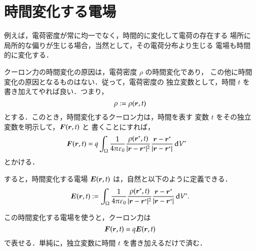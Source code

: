            \section{時間変化する電場}
                例えば，電荷密度が常に均一でなく，時間的に変化して電荷の存在する
                場所に局所的な偏りが生じる場合，当然として，その電荷分布より生じる
                電場も時間的に変化する．

                クーロン力の時間変化の原因は，電荷密度 $\rho$ の時間変化であり，
                この他に時間変化の原因となるものはない．従って，電荷密度の
                独立変数として，時間 $t$ を書き加えてやれば良い．つまり，
                    \begin{equation*}
                        \rho := \rho(\boldsymbol{r}, t)
                    \end{equation*}
                とする．このとき，時間変化するクーロン力は，時間を表す
                変数 $t$ をその独立変数を明示して，$\boldsymbol{F}(\boldsymbol{r}, t)$ と
                書くことにすれば，
                    \begin{align}
                        \boldsymbol{F}(\boldsymbol{r}, t)
                        &=q\int_\Omega \frac{1}{4\pi\varepsilon_{0}}
                        \frac{\rho(\boldsymbol{r}^{*}, t)}{|\boldsymbol{r}-\boldsymbol{r}^{*}|^{2}}
                        \frac{\boldsymbol{r}-\boldsymbol{r}^{*}}
                             {|\boldsymbol{r}-\boldsymbol{r}^{*}|}\,\mathrm{d} V^{*}
                    \end{align}
                とかける．

                すると，時間変化する電場 $\boldsymbol{E}(\boldsymbol{r}, t)$ は，自然と以下のように定義できる．
                    \begin{align}
                        \boldsymbol{E}(\boldsymbol{r}, t)
                        :=\int_\Omega \frac{1}{4\pi\varepsilon_{0}}
                        \frac{\rho(\boldsymbol{r}^{*}, t)}{|\boldsymbol{r}-\boldsymbol{r}^{*}|^{2}}
                        \frac{\boldsymbol{r}-\boldsymbol{r}^{*}}
                        {|\boldsymbol{r}-\boldsymbol{r}^{*}|}\,\mathrm{d} V^{*}.
                    \end{align}

                この時間変化する電場を使うと，クーロン力は
                    \begin{equation*}
                        \boldsymbol{F}(\boldsymbol{r},t) = q\boldsymbol{E}(\boldsymbol{r}, t)
                    \end{equation*}
                 で表せる．単純に，独立変数に時間 $t$ を書き加えるだけで済む．

